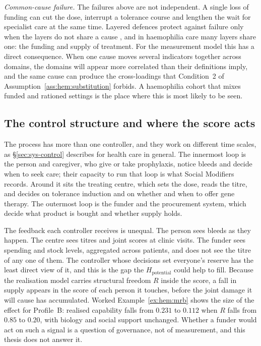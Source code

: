 \emph{Common-cause failure.} The failures above are not independent. A single loss of funding can cut the dose, interrupt a tolerance course and lengthen the wait for specialist care at the same time. Layered defences protect against failure only when the layers do not share a cause \citep{reason_1990}, and in haemophilia care many layers share one: the funding and supply of treatment. For the measurement model this has a direct consequence. When one cause moves several indicators together across domains, the domains will appear more correlated than their definitions imply, and the same cause can produce the cross-loadings that Condition~2 of Assumption~\ref{ass:hem:substitution} forbids. A haemophilia cohort that mixes funded and rationed settings is the place where this is most likely to be seen.

\subsection{The control structure and where the score acts}

The process has more than one controller, and they work on different time scales, as \S\ref{sec:sys-control} describes for health care in general. The innermost loop is the person and caregiver, who give or take prophylaxis, notice bleeds and decide when to seek care; their capacity to run that loop is what Social Modifiers records. Around it sits the treating centre, which sets the dose, reads the titre, and decides on tolerance induction and on whether and when to offer gene therapy. The outermost loop is the funder and the procurement system, which decide what product is bought and whether supply holds.

The feedback each controller receives is unequal. The person sees bleeds as they happen. The centre sees titres and joint scores at clinic visits. The funder sees spending and stock levels, aggregated across patients, and does not see the titre of any one of them. The controller whose decisions set everyone's reserve has the least direct view of it, and this is the gap the $H_{\text{potential}}$ could help to fill. Because the realisation model carries structural freedom $R$ inside the score, a fall in supply appears in the score of each person it touches, before the joint damage it will cause has accumulated. Worked Example~\ref{ex:hem:mrb} shows the size of the effect for Profile~B: realised capability falls from $0.231$ to $0.112$ when $R$ falls from $0.85$ to $0.20$, with biology and social support unchanged. Whether a funder would act on such a signal is a question of governance, not of measurement, and this thesis does not answer it.

